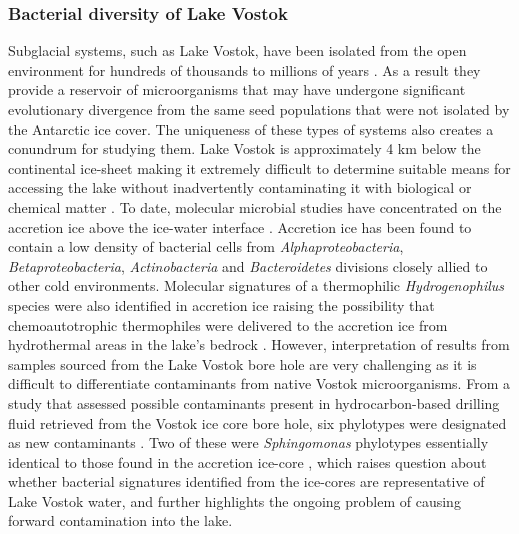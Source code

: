 \subsubsection{Bacterial diversity of Lake Vostok}
Subglacial systems, such as Lake Vostok, have been isolated from the open environment for hundreds of thousands to millions of years \cite{Siegert2001}.
As a result they provide a reservoir of microorganisms that may have undergone significant evolutionary divergence from the same seed populations that were not isolated by the Antarctic ice cover. 
The uniqueness of these types of systems also creates a conundrum for studying them. 
Lake Vostok is approximately 4 km below the continental ice-sheet making it extremely difficult to determine suitable means for accessing the lake without inadvertently contaminating it with biological
 or chemical matter \cite{Inman 2005, Wingham2006, Lukin2011, Gramling2012, Jones2012}. 
To date, molecular microbial studies have concentrated on the accretion ice above the ice-water interface \cite{Priscu1999, Christner2000}.
Accretion ice has been found to contain a low density of bacterial cells from \emph{Alphaproteobacteria}, \emph{Betaproteobacteria}, \emph{Actinobacteria} and \emph{Bacteroidetes} divisions closely allied to other cold environments.
Molecular signatures of a thermophilic \emph{Hydrogenophilus} species were also identified in accretion ice 
raising the possibility that chemoautotrophic thermophiles were delivered to the accretion ice from hydrothermal areas in the lake’s bedrock \cite{Bulat2004, Lavire2007}.
However, interpretation of results from samples sourced from the Lake Vostok bore hole are very challenging as it is difficult to differentiate contaminants from native Vostok microorganisms.
From a study that assessed possible contaminants present in hydrocarbon-based drilling fluid retrieved from the Vostok ice core bore hole, 
six phylotypes were designated as new contaminants \cite{Alekhina2007}. 
Two of these were \emph{Sphingomonas} phylotypes essentially identical to those found in the accretion ice-core \cite{Christner2000},
 which raises question about whether bacterial signatures identified from the ice-cores are representative of Lake Vostok water,
 and further highlights the ongoing problem of causing forward contamination into the lake.

